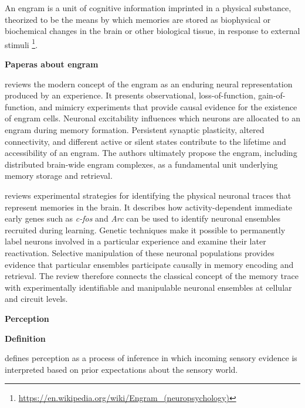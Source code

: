\documentclass{book}
\providecommand{\ProjectDeepHeading}[2]{%
    \par\medskip\noindent\textbf{#2}\par\smallskip
}
\providecommand{\seeherefooter}[1]{\footnote{\url{#1}}}
\begin{document}
      An engram is a unit of cognitive information imprinted in a physical substance, theorized to be the means by which memories are stored as biophysical or biochemical changes in the brain or other biological tissue, in response to external stimuli \seeherefooter{https://en.wikipedia.org/wiki/Engram_(neuropsychology)}.

      \ProjectDeepHeading{10}{Paperas about engram}
      \cite{josselyn-2020-memory-engrams-recalling-the-past-and-imagining-the-future} reviews the modern concept of the engram as an enduring neural representation produced by an experience. It presents observational, loss-of-function, gain-of-function, and mimicry experiments that provide causal evidence for the existence of engram cells. Neuronal excitability influences which neurons are allocated to an engram during memory formation. Persistent synaptic plasticity, altered connectivity, and different active or silent states contribute to the lifetime and accessibility of an engram. The authors ultimately propose the engram, including distributed brain-wide engram complexes, as a fundamental unit underlying memory storage and retrieval.


      \cite{sakaguchi-2012-catching-the-engram-strategies-to-examine-the-memory-trace} reviews experimental strategies for identifying the physical neuronal traces that represent memories in the brain. It describes how activity-dependent immediate early genes such as \textit{c-fos} and \textit{Arc} can be used to identify neuronal ensembles recruited during learning. Genetic techniques make it possible to permanently label neurons involved in a particular experience and examine their later reactivation.
      Selective manipulation of these neuronal populations provides evidence that particular ensembles participate causally in memory encoding and retrieval. The review therefore connects the classical concept of the memory trace with experimentally identifiable and manipulable neuronal ensembles at cellular and circuit levels.

\ProjectDeepHeading{4}{Perception}


\ProjectDeepHeading{7}{Definition}
    \cite{shin-2026-the-neural-code-of-perceptual-inference} defines perception as a process of inference in which incoming sensory evidence is interpreted based on prior expectations about the sensory world.
    
\end{document}
